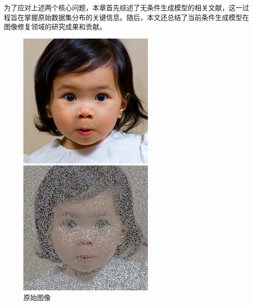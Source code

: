 为了应对上述两个核心问题，本章首先综述了无条件生成模型的相关文献，这一过程旨在掌握原始数据集分布的关键信息。随后，本文还总结了当前条件生成模型在图像修复领域的研究成果和贡献。
\begin{figure}[H]
  \centering
  \begin{minipage}[b]{0.45\linewidth}
    \includegraphics[width=\linewidth]{ThuThesis_ Tsinghua University Thesis LaTeX Template/figures/intro/input.png}
    \caption{原始图像}
    \label{original image }
  \end{minipage}
  \hspace{0.5cm} %
  \begin{minipage}[b]{0.45\linewidth}
    \includegraphics[width=\linewidth]{ThuThesis_ Tsinghua University Thesis LaTeX Template/figures/intro/label.png}

\end{minipage}
\end{figure}

